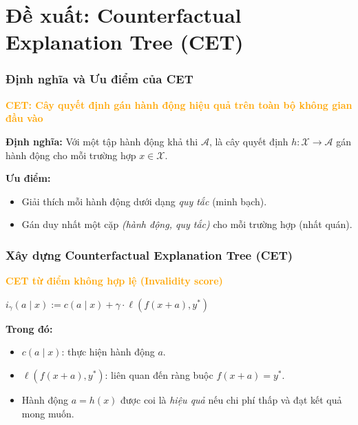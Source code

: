 \documentclass[notheorems, aspectratio=149]{beamer}
\begin{document}
\section{Đề xuất: Counterfactual Explanation Tree (CET)}

\begin{frame}
    \frametitle{Định nghĩa và Ưu điểm của CET}

    \begin{tcolorbox}[custombox]
        \centering
        \textbf{\textcolor{orange}{CET: Cây quyết định gán hành động hiệu quả trên toàn bộ không gian đầu vào}}
    \end{tcolorbox}

    \textbf{Định nghĩa:}  
    Với một tập hành động khả thi $\mathcal{A}$,  
     là cây quyết định $h: \mathcal{X} \to \mathcal{A}$  
    gán hành động cho mỗi trường hợp $x \in \mathcal{X}$.

    \vspace{0.3cm}
    \textbf{Ưu điểm:}
    \begin{itemize}
        \item Giải thích mỗi hành động dưới dạng \textit{quy tắc} (minh bạch).
        \item Gán duy nhất một cặp \textit{(hành động, quy tắc)} cho mỗi trường hợp (nhất quán).
    \end{itemize}
\end{frame}

\begin{frame}
    \frametitle{Xây dựng Counterfactual Explanation Tree (CET)}

    \begin{tcolorbox}[custombox]
        \centering
        \textbf{\textcolor{orange}{CET từ điểm không hợp lệ (Invalidity score)}}  
    \end{tcolorbox}

    \begin{center}
    \begin{highlightformula}
        $\displaystyle i_{\gamma}(a \mid x) := c(a \mid x) + \gamma \cdot \ell(f(x+a), y^*)$
    \end{highlightformula}
    \end{center}

    \textbf{Trong đó:}
    \begin{itemize}
        \item $c(a \mid x)$:  thực hiện hành động $a$.  
        \item $\ell(f(x+a), y^*)$:  liên quan đến ràng buộc $f(x+a) = y^*$.  
        \item Hành động $a = h(x)$ được coi là \textit{hiệu quả} nếu chi phí thấp và đạt kết quả mong muốn.
    \end{itemize}
\end{frame}
\end{document}
